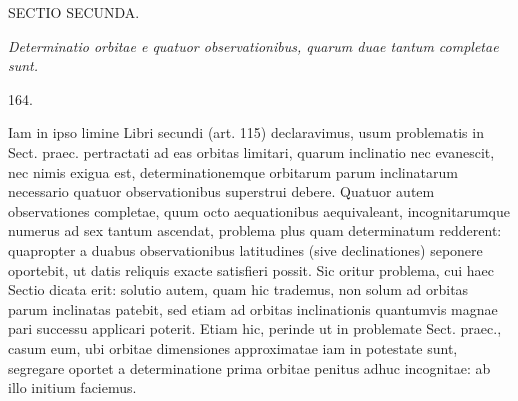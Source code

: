 \clearpage
{}
\begin{center}
{\large SECTIO SECUNDA.}\par\medskip
\emph{Determinatio orbitae e quatuor observationibus, quarum duae tantum completae sunt.}\par\bigskip
\hypertarget{native-228-article164}{}164.
\end{center}
Iam in ipso limine Libri secundi (art. 115) declaravimus, usum problematis
in Sect. praec. pertractati ad eas orbitas limitari, quarum inclinatio nec
evanescit, nec nimis exigua est, determinationemque orbitarum parum inclinatarum
necessario quatuor observationibus superstrui debere. Quatuor autem
observationes completae, quum octo aequationibus aequivaleant, incognitarumque
numerus ad sex tantum ascendat, problema plus quam determinatum redderent:
quapropter a duabus observationibus latitudines (sive declinationes) seponere
oportebit, ut datis reliquis exacte satisfieri possit. Sic oritur problema,
cui haec Sectio dicata erit: solutio autem, quam hic trademus, non solum ad
orbitas parum inclinatas patebit, sed etiam ad orbitas inclinationis quantumvis
magnae pari successu applicari poterit. Etiam hic, perinde ut in problemate
Sect. praec., casum eum, ubi orbitae dimensiones approximatae iam in potestate
sunt, segregare oportet a determinatione prima orbitae penitus adhuc incognitae:
ab illo initium faciemus.
